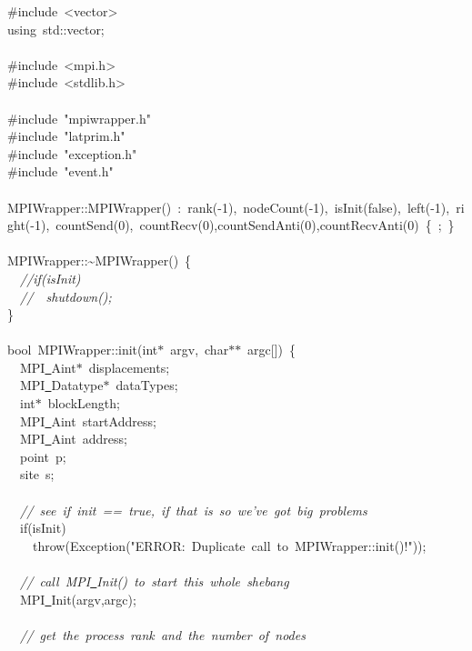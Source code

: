 {\ttfamily \raggedright \small
\#include\ <{}vector>{}\\
using\ std::vector;\\
\ \\
\#include\ <{}mpi.h>{}\\
\#include\ <{}stdlib.h>{}\\
\ \\
\#include\ "{}mpiwrapper.h"{}\\
\#include\ "{}latprim.h"{}\\
\#include\ "{}exception.h"{}\\
\#include\ "{}event.h"{}\\
\ \\
MPIWrapper::MPIWrapper()\ :\ rank(-{}1),\ nodeCount(-{}1),\ isInit(false),\ left(-{}1),\ right(-{}1),\ countSend(0),\ countRecv(0),countSendAnti(0),countRecvAnti(0)\ \{\ ;\ \}\\
\ \\
MPIWrapper::\textasciitilde MPIWrapper()\ \{\\
\ \ \textsl{//if(isInit)}\\
\ \ \textsl{//\ \ shutdown();}\\
\}\\
\ \\
bool\ MPIWrapper::init(int$\ast$\ argv,\ char$\ast$$\ast$\ argc[])\ \{\\
\ \ MPI\underline\ Aint$\ast$\ displacements;\\
\ \ MPI\underline\ Datatype$\ast$\ dataTypes;\\
\ \ int$\ast$\ blockLength;\\
\ \ MPI\underline\ Aint\ startAddress;\\
\ \ MPI\underline\ Aint\ address;\\
\ \ point\ p;\\
\ \ site\ s;\\
\ \\
\ \ \textsl{//\ see\ if\ init\ ==\ true,\ if\ that\ is\ so\ we've\ got\ big\ problems}\\
\ \ if(isInit)\\
\ \ \ \ throw(Exception("{}ERROR:\ Duplicate\ call\ to\ MPIWrapper::init()!"{}));\\
\ \\
\ \ \textsl{//\ call\ MPI\underline\ Init()\ to\ start\ this\ whole\ shebang}\\
\ \ MPI\underline\ Init(argv,argc);\\
\ \\
\ \ \textsl{//\ get\ the\ process\ rank\ and\ the\ number\ of\ nodes}\\
$$}
